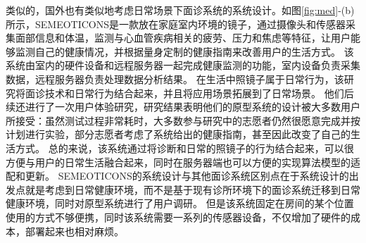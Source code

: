 类似的，国外也有类似地考虑日常场景下面诊系统的系统设计。如图\ref{fig:med}-(b)所示，SEMEOTICONS\cite{andreu2015mirror}是一款放在家庭室内环境的镜子，通过摄像头和传感器采集面部信息和体温，监测与心血管疾病相关的疲劳、压力和焦虑等特征，让用户能够监测自己的健康情况，并根据量身定制的健康指南来改善用户的生活方式。
该系统由室内的硬件设备和远程服务器一起完成健康监测的功能，室内设备负责采集数据，远程服务器负责处理数据分析结果。
在生活中照镜子属于日常行为，该研究将面诊技术和日常行为结合起来，并且将应用场景拓展到了日常场景。
他们后续还进行了一次用户体验研究，研究结果表明\cite{coppini2017user}他们的原型系统的设计被大多数用户所接受：虽然测试过程非常耗时，大多数参与研究中的志愿者仍然很愿意完成并按计划进行实验，部分志愿者考虑了系统给出的健康指南，甚至因此改变了自己的生活方式。
总的来说，该系统通过将诊断和日常的照镜子的行为结合起来，可以很方便与用户的日常生活融合起来，同时在服务器端也可以方便的实现算法模型的适配和更新。
SEMEOTICONS的系统设计与其他面诊系统区别点在于系统设计的出发点就是考虑到日常健康环境，而不是基于现有诊所环境下的面诊系统迁移到日常健康环境，同时对原型系统进行了用户调研。
但是该系统固定在房间的某个位置使用的方式不够便携，同时该系统需要一系列的传感器设备，不仅增加了硬件的成本，部署起来也相对麻烦。



